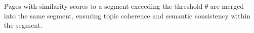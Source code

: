 \documentclass[11pt]{article}
\begin{document}
Pages with similarity scores to a segment exceeding the threshold $\theta$ are merged into the same segment, ensuring topic coherence and semantic consistency within the segment.









\end{document}
